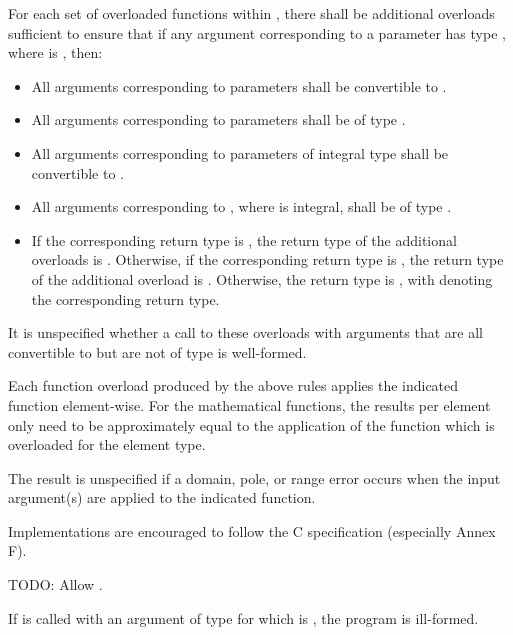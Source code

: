 \pnum
For each set of overloaded functions within , there shall be additional overloads sufficient to ensure that if any argument corresponding to a  parameter has type , where  is , then:
\begin{itemize}
  \item All arguments corresponding to  parameters shall be convertible to .
  \item All arguments corresponding to  parameters shall be of type .
  \item All arguments corresponding to parameters of integral type  shall be convertible to .
  \item All arguments corresponding to , where  is integral, shall be of type .
  \item If the corresponding return type is , the return type of the additional overloads is . Otherwise, if the corresponding return type is , the return type of the additional overload is . Otherwise, the return type is , with  denoting the corresponding return type.
\end{itemize}
It is unspecified whether a call to these overloads with arguments that are all convertible to  but are not of type  is well-formed.

\pnum
Each function overload produced by the above rules applies the indicated  function element-wise. For the mathematical functions, the results per element only need to be approximately equal to the application of the function which is overloaded for the element type.

\pnum
The result is unspecified if a domain, pole, or range error occurs when the input argument(s) are applied to the indicated  function.
\begin{note}Implementations are encouraged to follow the C specification (especially Annex F).\end{note}

\pnum
TODO: Allow .

\pnum
If  is called with an argument of type  for which  is , the program is ill-formed.

